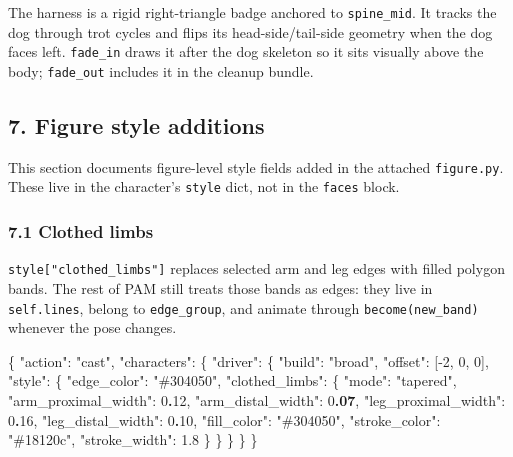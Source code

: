 \documentclass[
  11pt,
]{book}
\newenvironment{Shaded}{}{}
\newcommand{\DataTypeTok}[1]{\textcolor[rgb]{0.56,0.13,0.00}{#1}}
\newcommand{\DecValTok}[1]{\textcolor[rgb]{0.25,0.63,0.44}{#1}}
\newcommand{\ErrorTok}[1]{\textcolor[rgb]{1.00,0.00,0.00}{\textbf{#1}}}
\newcommand{\FloatTok}[1]{\textcolor[rgb]{0.25,0.63,0.44}{#1}}
\newcommand{\FunctionTok}[1]{\textcolor[rgb]{0.02,0.16,0.49}{#1}}
\newcommand{\OtherTok}[1]{\textcolor[rgb]{0.00,0.44,0.13}{#1}}
\newcommand{\StringTok}[1]{\textcolor[rgb]{0.25,0.44,0.63}{#1}}
\begin{document}
The harness is a rigid right-triangle badge anchored to
\texttt{spine\_mid}. It tracks the dog through trot cycles and flips its
head-side/tail-side geometry when the dog faces left. \texttt{fade\_in}
draws it after the dog skeleton so it sits visually above the body;
\texttt{fade\_out} includes it in the cleanup bundle.

\subsection{7. Figure style additions}\label{figure-style-additions}

This section documents figure-level style fields added in the attached
\texttt{figure.py}. These live in the character's \texttt{style} dict,
not in the \texttt{faces} block.

\subsubsection{7.1 Clothed limbs}\label{clothed-limbs}

\texttt{style{[}"clothed\_limbs"{]}} replaces selected arm and leg edges
with filled polygon bands. The rest of PAM still treats those bands as
edges: they live in \texttt{self.lines}, belong to \texttt{edge\_group},
and animate through \texttt{become(new\_band)} whenever the pose
changes.

\begin{Shaded}
\begin{Highlighting}[]
\FunctionTok{\{}
  \DataTypeTok{"action"}\FunctionTok{:} \StringTok{"cast"}\FunctionTok{,}
  \DataTypeTok{"characters"}\FunctionTok{:} \FunctionTok{\{}
    \DataTypeTok{"driver"}\FunctionTok{:} \FunctionTok{\{}
      \DataTypeTok{"build"}\FunctionTok{:} \StringTok{"broad"}\FunctionTok{,}
      \DataTypeTok{"offset"}\FunctionTok{:} \OtherTok{[}\DecValTok{{-}2}\OtherTok{,} \DecValTok{0}\OtherTok{,} \DecValTok{0}\OtherTok{]}\FunctionTok{,}
      \DataTypeTok{"style"}\FunctionTok{:} \FunctionTok{\{}
        \DataTypeTok{"edge\_color"}\FunctionTok{:} \StringTok{"\#304050"}\FunctionTok{,}
        \DataTypeTok{"clothed\_limbs"}\FunctionTok{:} \FunctionTok{\{}
          \DataTypeTok{"mode"}\FunctionTok{:} \StringTok{"tapered"}\FunctionTok{,}
          \DataTypeTok{"arm\_proximal\_width"}\FunctionTok{:} \DecValTok{0}\ErrorTok{.}\DecValTok{12}\FunctionTok{,}
          \DataTypeTok{"arm\_distal\_width"}\FunctionTok{:} \DecValTok{0}\ErrorTok{.07}\FunctionTok{,}
          \DataTypeTok{"leg\_proximal\_width"}\FunctionTok{:} \DecValTok{0}\ErrorTok{.}\DecValTok{16}\FunctionTok{,}
          \DataTypeTok{"leg\_distal\_width"}\FunctionTok{:} \DecValTok{0}\ErrorTok{.}\DecValTok{10}\FunctionTok{,}
          \DataTypeTok{"fill\_color"}\FunctionTok{:} \StringTok{"\#304050"}\FunctionTok{,}
          \DataTypeTok{"stroke\_color"}\FunctionTok{:} \StringTok{"\#18120c"}\FunctionTok{,}
          \DataTypeTok{"stroke\_width"}\FunctionTok{:} \FloatTok{1.8}
        \FunctionTok{\}}
      \FunctionTok{\}}
    \FunctionTok{\}}
  \FunctionTok{\}}
\FunctionTok{\}}
\end{Highlighting}
\end{Shaded}
\end{document}

